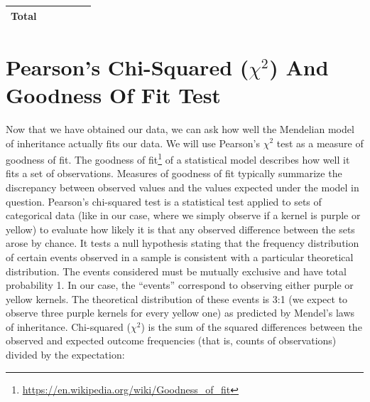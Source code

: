\documentclass[]{book}
\let\rmarkdownfootnote\footnote%
\def\footnote{\protect\rmarkdownfootnote}
\renewcommand{\href}[2]{#2\footnote{\url{#1}}}
\theoremstyle{definition}
\theoremstyle{definition}
\theoremstyle{definition}
\theoremstyle{remark}
\begin{document}
\begin{longtable}[]{@{}clllll@{}}
\begin{minipage}[t]{0.05\columnwidth}\centering\strut
Total\strut
\end{minipage} & \begin{minipage}[t]{0.19\columnwidth}\raggedright\strut
\strut
\end{minipage} & \begin{minipage}[t]{0.19\columnwidth}\raggedright\strut
\strut
\end{minipage} & \begin{minipage}[t]{0.19\columnwidth}\raggedright\strut
\strut
\end{minipage} & \begin{minipage}[t]{0.19\columnwidth}\raggedright\strut
\strut
\end{minipage} & \begin{minipage}[t]{0.04\columnwidth}\raggedright\strut
\strut
\end{minipage}\tabularnewline
\bottomrule
\end{longtable}

\section{\texorpdfstring{Pearson's Chi-Squared (\(\chi^2\)) And Goodness
Of Fit
Test}{Pearson's Chi-Squared (\textbackslash{}chi\^{}2) And Goodness Of Fit Test}}\label{pearsons-chi-squared-chi2-and-goodness-of-fit-test}

Now that we have obtained our data, we can ask how well the Mendelian
model of inheritance actually fits our data. We will use Pearson's
\(\chi^2\) test as a measure of goodness of fit. The
\href{https://en.wikipedia.org/wiki/Goodness_of_fit}{goodness of fit} of
a statistical model describes how well it fits a set of observations.
Measures of goodness of fit typically summarize the discrepancy between
observed values and the values expected under the model in question.
Pearson's chi-squared test is a statistical test applied to sets of
categorical data (like in our case, where we simply observe if a kernel
is purple or yellow) to evaluate how likely it is that any observed
difference between the sets arose by chance. It tests a null hypothesis
stating that the frequency distribution of certain events observed in a
sample is consistent with a particular theoretical distribution. The
events considered must be mutually exclusive and have total probability
1. In our case, the ``events'' correspond to observing either purple or
yellow kernels. The theoretical distribution of these events is 3:1 (we
expect to observe three purple kernels for every yellow one) as
predicted by Mendel's laws of inheritance. Chi-squared (\(\chi^2\)) is
the sum of the squared differences between the observed and expected
outcome frequencies (that is, counts of observations) divided by the
expectation:
\end{document}
